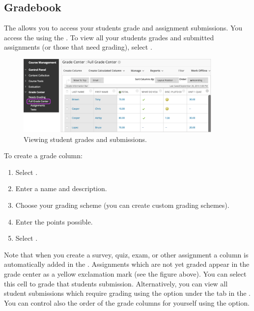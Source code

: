 \subsection{Gradebook}

The  allows you to access your students grade and assignment submissions. You access the  using the . To view all your students grades and submitted assignments (or those that need grading), select .

	\begin{figure}[!ht]
	\centering
	\includegraphics[width=0.9\textwidth]{sections/blackboard/images/original_access_grade_center}
	\caption{Viewing student grades and submissions.}
	\end{figure}

To create a grade column:

	\begin{enumerate}[1.]
	\item Select .
	\item Enter a name and description. 
	\item Choose your grading scheme (you can create custom grading schemes).
	\item Enter the points possible. 
	\item Select .
	\end{enumerate}

Note that when you create a survey, quiz, exam, or other assignment a column is automatically added in the . Assignments which are not yet graded appear in the grade center as a yellow exclamation mark (see the figure above). You can select this cell to grade that students submission. Alternatively, you can view all student submissions which require grading using the  option under the  tab in the . You can control also the order of the grade columns for yourself using the  option.

